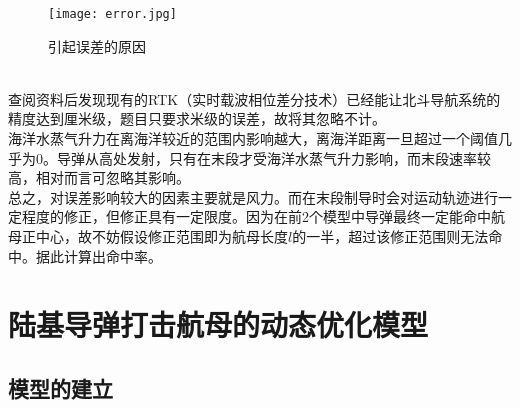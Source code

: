 \documentclass[UTF8]{article}
\begin{document}
\begin{enumerate}[1]
\begin{figure}[htbp]
\small
\centering
\texttt{[image: error.jpg]}
\caption{引起误差的原因}
\end{figure}\\
查阅资料后发现现有的RTK（实时载波相位差分技术）已经能让北斗导航系统的精度达到厘米级，题目只要求米级的误差，故将其忽略不计。\\
海洋水蒸气升力在离海洋较近的范围内影响越大，离海洋距离一旦超过一个阈值几乎为0。导弹从高处发射，只有在末段才受海洋水蒸气升力影响，而末段速率较高，相对而言可忽略其影响。\\
总之，对误差影响较大的因素主要就是风力。而在末段制导时会对运动轨迹进行一定程度的修正，但修正具有一定限度。因为在前2个模型中导弹最终一定能命中航母正中心，故不妨假设修正范围即为航母长度\(l\)的一半，超过该修正范围则无法命中。据此计算出命中率。
\end{enumerate}

\section{陆基导弹打击航母的动态优化模型}
\subsection{模型的建立}
\end{document}
